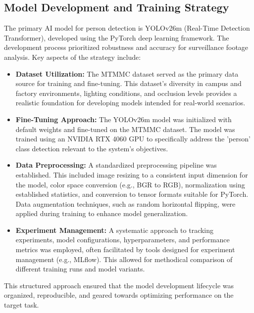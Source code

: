 \subsection{Model Development and Training Strategy}
\label{subsection:model_dev_train_strat_new}
The primary AI model for person detection is YOLOv26m (Real-Time Detection Transformer), developed using the PyTorch deep learning framework. The development process prioritized robustness and accuracy for surveillance footage analysis.
Key aspects of the strategy include:
\begin{itemize}

    \item \textbf{Dataset Utilization:} The MTMMC dataset served as the primary data source for training and fine-tuning. This dataset's diversity in campus and factory environments, lighting conditions, and occlusion levels provides a realistic foundation for developing models intended for real-world scenarios.
    \item \textbf{Fine-Tuning Approach:} The YOLOv26m model was initialized with default weights and fine-tuned on the MTMMC dataset. The model was trained using an NVIDIA RTX 4060 GPU to specifically address the 'person' class detection relevant to the system's objectives.
    \item \textbf{Data Preprocessing:} A standardized preprocessing pipeline was established. This included image resizing to a consistent input dimension for the model, color space conversion (e.g., BGR to RGB), normalization using established statistics, and conversion to tensor formats suitable for PyTorch. Data augmentation techniques, such as random horizontal flipping, were applied during training to enhance model generalization.
    \item \textbf{Experiment Management:} A systematic approach to tracking experiments, model configurations, hyperparameters, and performance metrics was employed, often facilitated by tools designed for experiment management (e.g., MLflow). This allowed for methodical comparison of different training runs and model variants.
\end{itemize}
This structured approach ensured that the model development lifecycle was organized, reproducible, and geared towards optimizing performance on the target task.

